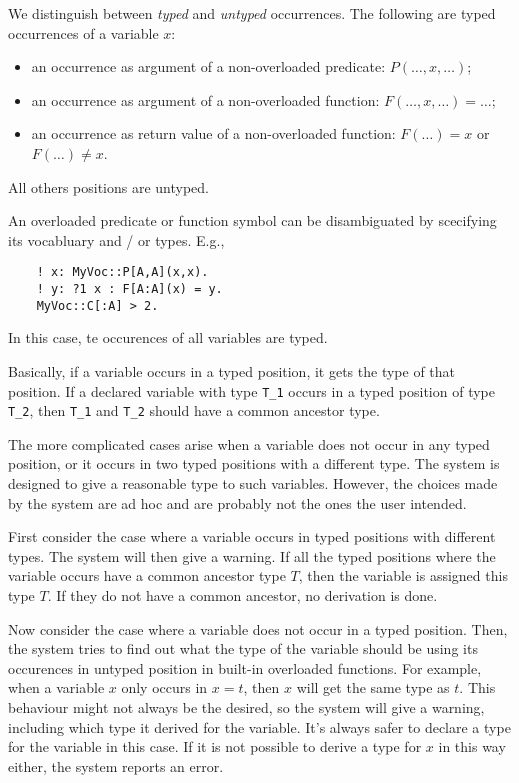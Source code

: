 \documentclass[a4]{article}
\begin{document}
We distinguish between \emph{typed} and \emph{untyped} occurrences. The following are typed occurrences of a variable $x$:
\begin{itemize}
	\item an occurrence as argument of a non-overloaded predicate: $P(\ldots,x,\ldots)$;
	\item an occurrence as argument of a non-overloaded function: $F(\ldots,x,\ldots) = \ldots$;
	\item an occurrence as return value of a non-overloaded function: $F(\ldots) = x$ or $F(\ldots) \neq x$. 
\end{itemize}

All others positions are untyped. 

An overloaded predicate or function symbol can be disambiguated by scecifying its vocabluary and / or types.  E.g.,
\begin{lstlisting}
	! x: MyVoc::P[A,A](x,x).
	! y: ?1 x : F[A:A](x) = y.
	MyVoc::C[:A] > 2.
\end{lstlisting}
In this case, te occurences of all variables are typed.


Basically, if a variable occurs in a typed position, it gets the type of that position.  
If a declared variable with type {\tt T\_1} occurs in a typed position of type {\tt T\_2}, then {\tt T\_1} and {\tt T\_2} should have a common ancestor type.


The more complicated cases arise when a variable does not occur in any typed position, or it occurs in two typed positions with a different type. The system is designed to give a reasonable type to such variables. However, the choices made by the system are ad hoc and are probably not the ones the user intended. %

First consider the case where a variable occurs in typed positions with different types. The \idp system will then give a warning. If all the typed positions where the variable occurs have a common ancestor type $T$, then the variable is assigned this type $T$. If they do not have a common ancestor, no derivation is done.

Now consider the case where a variable does not occur in a typed position. Then, the \idp system tries to find out what the type of the variable should be using its occurences in untyped position in built-in overloaded functions.  For example, when a variable $x$ only occurs in $x=t$, then $x$ will get the same type as $t$.  This behaviour might not always be the desired, so the \idp system will give a warning, including which type it derived for the variable.  It's always safer to declare a type for the variable in this case.  If it is not possible to derive a type for $x$ in this way either, the \idp system reports an error.
\end{document}
